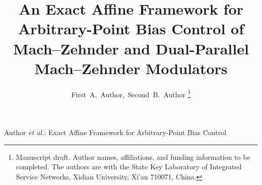 \documentclass[journal]{IEEEtran}
\begin{document}
\title{An Exact Affine Framework for Arbitrary-Point Bias Control of
Mach--Zehnder and Dual-Parallel Mach--Zehnder Modulators}

\author{First~A.~Author,~Second~B.~Author%
\thanks{Manuscript draft. Author names, affiliations, and funding
information to be completed. The authors are with the State Key Laboratory
of Integrated Service Networks, Xidian University, Xi'an 710071, China.}}

%
{Author \MakeLowercase{\textit{et al.}}: Exact Affine Framework for Arbitrary-Point Bias Control}

\maketitle
\end{document}
